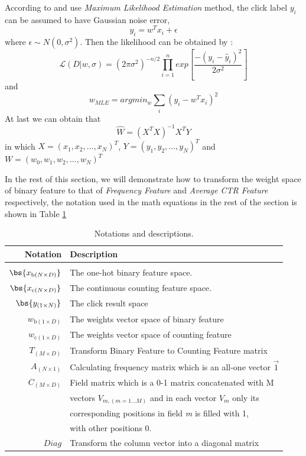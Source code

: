 According to \cite{prince2012computer} and use \textit{Maximum Likelihood Estimation} method, the click label \(y_i\) can be assumed to have Gaussian noise error, \begin{equation}
y_i = w^T x_i + \epsilon 
\end{equation}
where \(\epsilon \sim N(0,\sigma^2)\).
Then the likelihood can be obtained by :
\begin{equation}
\mathcal{L}(D | w, \sigma) = (2 \pi \sigma^2)^{-n/2} \prod_{i=1}^{n} exp \left[ \frac{-(y_i - \hat{y}_i)^2}{2\sigma^2} \right] 
\end{equation}
and 
\begin{equation}
w_{MLE} = argmin_w \sum_i  (y_i - w^T x_i)^2 
\end{equation}
At last we can obtain that 
\begin{equation}\label{eq:w}
\hat{W} = (X^T X)^{-1} X^T Y 
\end{equation}
in which  \(X = (x_1, x_2, \ldots, x_N)^T\), \(Y = (y_1, y_2, \ldots, y_N)^T\) and \(W = (w_0, w_1, w_2, \ldots, w_N)^T\)

In the rest of this section, we will demonstrate how to transform the weight space of binary feature to that of \textit{Frequency Feature} and \textit{Average CTR Feature} respectively, the notation used in the math equations in the rest of the section is shown in Table \ref{tab:notation-des}
\begin{table}[h]
\center
\vspace{-5pt}
\caption{Notations and descriptions.}
\label{tab:notation-des}
\small
\begin{tabular}{rl}
Notation & Description\\
\hline
\\ [-2.0ex]
$\bs{x_{\text{b}(N\times D)}}$ & The one-hot binary feature space.\\
$\bs{x_{\text{c}(N\times D)}}$ & The continuous counting feature space.\\
$\bs{y_{(1\times N)}}$ & The click result space\\
$w_{\text{b}(1\times D)}$ & The weights vector space of binary feature\\
$w_{\text{c}(1\times D)}$ & The weights vector space of counting feature\\
$T_{(M\times D)}$ & Transform Binary Feature to Counting Feature matrix\\
$A_{(N\times 1)}$ & Calculating frequency matrix which is an all-one vector $\vec{1 }$\\
$C_{(M\times D)}$ & Field  matrix which is a 0-1 matrix concatenated with \textsl{}{M} \\
& vectors \(V_{m,(m = 1...M)}\) and in each vector \(V_m\) only its \\
& corresponding positions in field \textsl{m} is filled with 1, \\
& with other positions 0. \\
$Diag$ & Transform the column vector into a diagonal matrix
\end{tabular}
\end{table}


